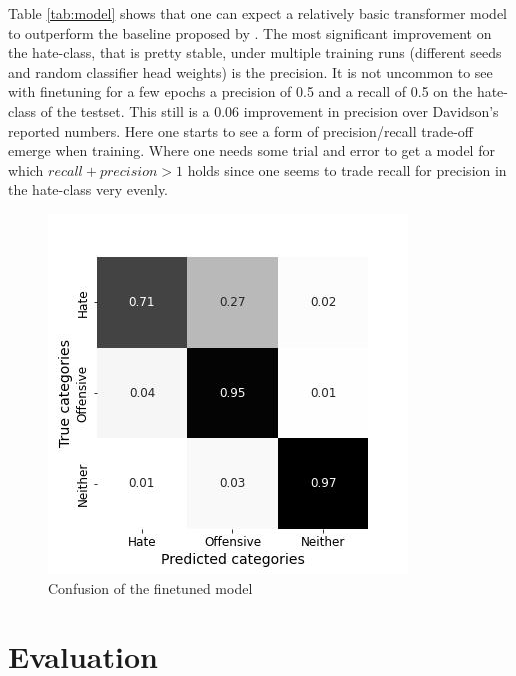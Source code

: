 \documentclass[11pt,a4paper]{article}
\begin{document}
Table \ref{tab:model} shows that one can expect a relatively basic transformer model to outperform the baseline proposed by \cite{auto_hatespeech}.
The most significant improvement on the hate-class, that is pretty stable, under multiple training runs (different seeds and random classifier head weights)
is the precision. It is not uncommon to see with finetuning for a few epochs a precision of 0.5 and a recall of 0.5 on the hate-class of the testset.
This still is a 0.06 improvement in precision over Davidson's reported numbers.
Here one starts to see a form of precision/recall trade-off emerge when training. Where one needs some trial and error to get a model for which 
$ recall + precision > 1 $ holds since one seems to trade recall for precision in the hate-class very evenly.
\begin{figure}[h]
 \includegraphics[width=\linewidth]{./tables-figures/model_confusion.jpg}
  \caption{Confusion of the finetuned model}
  \label{fig:model_confusion}
\end{figure}

\section{Evaluation}
\end{document}
